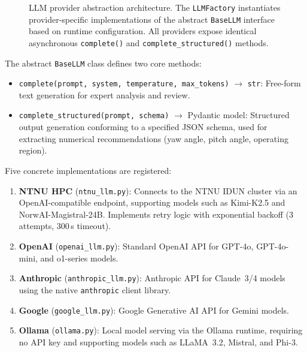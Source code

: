 \documentclass[12pt]{article}
\begin{document}
\begin{figure}[H]
{%
}%
\caption{LLM provider abstraction architecture. The \texttt{LLMFactory} instantiates provider-specific implementations of the abstract \texttt{BaseLLM} interface based on runtime configuration. All providers expose identical asynchronous \texttt{complete()} and \texttt{complete\_structured()} methods.}
\label{fig:llm_architecture}
\end{figure}

The abstract \texttt{BaseLLM} class defines two core methods:
\begin{itemize}[leftmargin=*]
    \item \texttt{complete(prompt, system, temperature, max\_tokens)} $\to$ \texttt{str}: Free-form text generation for expert analysis and review.
    \item \texttt{complete\_structured(prompt, schema)} $\to$ Pydantic model: Structured output generation conforming to a specified JSON schema, used for extracting numerical recommendations (yaw angle, pitch angle, operating region).
\end{itemize}

Five concrete implementations are registered:
\begin{enumerate}[leftmargin=*]
    \item \textbf{NTNU HPC} (\texttt{ntnu\_llm.py}): Connects to the NTNU IDUN cluster via an OpenAI-compatible endpoint, supporting models such as Kimi-K2.5 and NorwAI-Magistral-24B. Implements retry logic with exponential backoff (3 attempts, 300\,s timeout).
    \item \textbf{OpenAI} (\texttt{openai\_llm.py}): Standard OpenAI API for GPT-4o, GPT-4o-mini, and o1-series models.
    \item \textbf{Anthropic} (\texttt{anthropic\_llm.py}): Anthropic API for Claude~3/4 models using the native \texttt{anthropic} client library.
    \item \textbf{Google} (\texttt{google\_llm.py}): Google Generative AI API for Gemini models.
    \item \textbf{Ollama} (\texttt{ollama.py}): Local model serving via the Ollama runtime, requiring no API key and supporting models such as LLaMA~3.2, Mistral, and Phi-3.
\end{enumerate}
\end{document}
